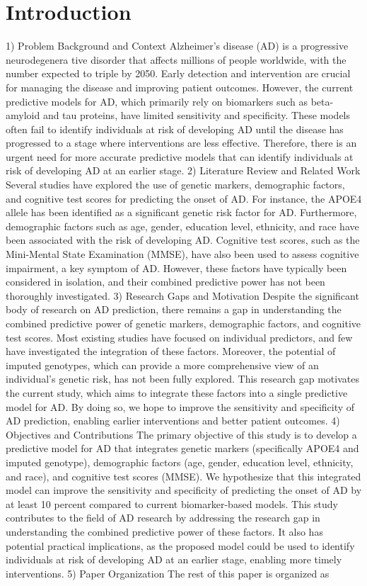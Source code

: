 \documentclass[conference]{IEEEtran}
\begin{document}
\section{Introduction}
1) Problem Background and Context Alzheimer's disease (AD) is a progressive neurodegenera tive disorder that affects millions of people worldwide, with the number expected to triple by 2050. Early detection and intervention are crucial for managing the disease and improving patient outcomes. However, the current predictive models for AD, which primarily rely on biomarkers such as beta-amyloid and tau proteins, have limited sensitivity and specificity. These models often fail to identify individuals at risk of developing AD until the disease has progressed to a stage where interventions are less effective. Therefore, there is an urgent need for more accurate predictive models that can identify individuals at risk of developing AD at an earlier stage. 2) Literature Review and Related Work Several studies have explored the use of genetic markers, demographic factors, and cognitive test scores for predicting the onset of AD. For instance, the APOE4 allele has been identified as a significant genetic risk factor for AD. Furthermore, demographic factors such as age, gender, education level, ethnicity, and race have been associated with the risk of developing AD. Cognitive test scores, such as the Mini-Mental State Examination (MMSE), have also been used to assess cognitive impairment, a key symptom of AD. However, these factors have typically been considered in isolation, and their combined predictive power has not been thoroughly investigated. 3) Research Gaps and Motivation Despite the significant body of research on AD prediction, there remains a gap in understanding the combined predictive power of genetic markers, demographic factors, and cognitive test scores. Most existing studies have focused on individual predictors, and few have investigated the integration of these factors. Moreover, the potential of imputed genotypes, which can provide a more comprehensive view of an individual's genetic risk, has not been fully explored. This research gap motivates the current study, which aims to integrate these factors into a single predictive model for AD. By doing so, we hope to improve the sensitivity and specificity of AD prediction, enabling earlier interventions and better patient outcomes. 4) Objectives and Contributions The primary objective of this study is to develop a predictive model for AD that integrates genetic markers (specifically APOE4 and imputed genotype), demographic factors (age, gender, education level, ethnicity, and race), and cognitive test scores (MMSE). We hypothesize that this integrated model can improve the sensitivity and specificity of predicting the onset of AD by at least 10 percent compared to current biomarker-based models. This study contributes to the field of AD research by addressing the research gap in understanding the combined predictive power of these factors. It also has potential practical implications, as the proposed model could be used to identify individuals at risk of developing AD at an earlier stage, enabling more timely interventions. 5) Paper Organization The rest of this paper is organized as 
\end{document}
